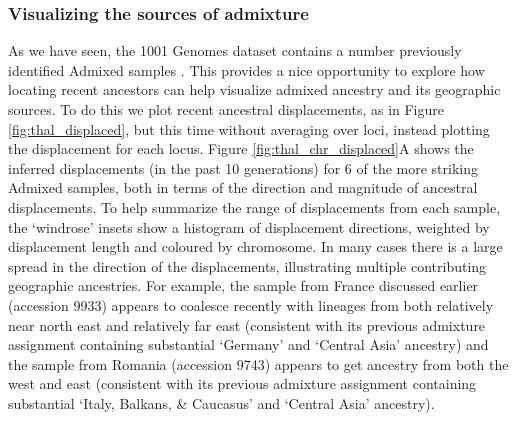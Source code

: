 \documentclass[12pt]{article}
\begin{document}
\subsubsection*{Visualizing the sources of admixture}

As we have seen, the 1001 Genomes dataset contains a number previously identified Admixed samples \citep{alonso2016}.
This provides a nice opportunity to explore how locating recent ancestors can help visualize admixed ancestry and its geographic sources. 
To do this we plot recent ancestral displacements, as in Figure \ref{fig:thal_displaced}, but this time without averaging over loci, instead plotting the displacement for each locus. 
Figure \ref{fig:thal_chr_displaced}A shows the inferred displacements (in the past 10 generations) for 6 of the more striking Admixed samples, both in terms of the direction and magnitude of ancestral displacements. 
To help summarize the range of displacements from each sample, the `windrose' insets show a histogram of displacement directions, weighted by displacement length and coloured by chromosome.
In many cases there is a large spread in the direction of the displacements, illustrating multiple contributing geographic ancestries.
For example, the sample from France discussed earlier (accession 9933) appears to coalesce recently with lineages from both relatively near north east and relatively far east (consistent with its previous admixture assignment containing substantial `Germany' and `Central Asia' ancestry) and the sample from Romania (accession 9743) appears to get ancestry from both the west and east (consistent with its previous admixture assignment containing substantial `Italy, Balkans, \& Caucasus' and `Central Asia' ancestry). 

\end{document}
